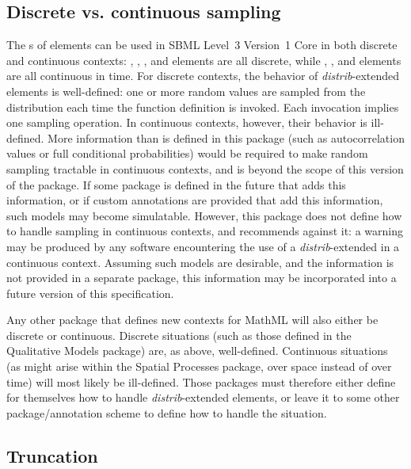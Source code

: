 \documentclass[draftspec]{sbmlpkgspec}
\newcommand{\sbmlthreecore}{SBML Level~3 Version~1 Core\xspace}
\newcommand{\distribshort}{\emph{distrib}\xspace}
\begin{document}
\subsection{Discrete vs. continuous sampling}
\label{discrete-continuous}

The s of \FunctionDefinition elements can be used in \sbmlthreecore in both discrete and continuous contexts:  \InitialAssignment, \EventAssignment, \Priority, and \Delay elements are all discrete, while \Rule, \KineticLaw, and \Trigger elements are all continuous in time.  For discrete contexts, the behavior of \distribshort-extended \FunctionDefinition elements is well-defined:  one or more random values are sampled from the distribution each time the function definition is invoked. Each invocation implies one sampling operation.  In continuous contexts, however, their behavior is ill-defined.  More information than is defined in this package (such as autocorrelation values or full conditional probabilities) would be required to make random sampling tractable in continuous contexts, and is beyond the scope of this version of the package.  If some package is defined in the future that adds this information, or if custom annotations are provided that add this information, such models may become simulatable.  However, this package does not define how to handle sampling in continuous contexts, and recommends against it: a warning may be produced by any software encountering the use of a \distribshort-extended \FunctionDefinition in a continuous context.  Assuming such models are desirable, and the information is not provided in a separate package, this information may be incorporated into a future version of this specification.

Any other package that defines new contexts for MathML will also either be discrete or continuous.  Discrete situations (such as those defined in the Qualitative Models package) are, as above, well-defined.  Continuous situations (as might arise within the Spatial Processes package, over space instead of over time) will most likely be ill-defined.  Those packages must therefore either define for themselves how to handle \distribshort-extended \FunctionDefinition elements, or leave it to some other package/annotation scheme to define how to handle the situation.


\subsection{Truncation}
\label{truncation}
\end{document}
